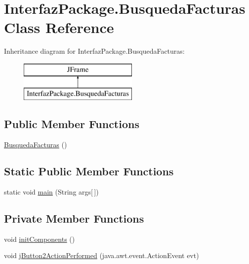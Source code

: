\hypertarget{class_interfaz_package_1_1_busqueda_facturas}{}\section{Interfaz\+Package.\+Busqueda\+Facturas Class Reference}
\label{class_interfaz_package_1_1_busqueda_facturas}
Inheritance diagram for Interfaz\+Package.\+Busqueda\+Facturas\+:\begin{figure}[H]
\begin{center}
\leavevmode
\includegraphics[height=2.000000cm]{class_interfaz_package_1_1_busqueda_facturas}
\end{center}
\end{figure}
\subsection*{Public Member Functions}
\begin{DoxyCompactItemize}
\item 
\mbox{\hyperlink{class_interfaz_package_1_1_busqueda_facturas_ab8143adc0ff8d4b0bd5d726a3930e0f7}{Busqueda\+Facturas}} ()
\end{DoxyCompactItemize}
\subsection*{Static Public Member Functions}
\begin{DoxyCompactItemize}
\item 
static void \mbox{\hyperlink{class_interfaz_package_1_1_busqueda_facturas_a82603c4df5b4715daf0085c622e48d08}{main}} (String args\mbox{[}$\,$\mbox{]})
\end{DoxyCompactItemize}
\subsection*{Private Member Functions}
\begin{DoxyCompactItemize}
\item 
void \mbox{\hyperlink{class_interfaz_package_1_1_busqueda_facturas_a825a805ad4894078abce578e267f0c95}{init\+Components}} ()
\item 
void \mbox{\hyperlink{class_interfaz_package_1_1_busqueda_facturas_a2f1ef5a0573d3c0079b0c2ec4c1425f9}{j\+Button2\+Action\+Performed}} (java.\+awt.\+event.\+Action\+Event evt)
\end{DoxyCompactItemize}
